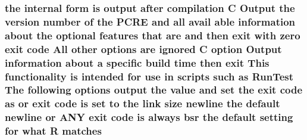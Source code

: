 \subsubsection[{\texorpdfstring{matches}{matches}}]{\setlength{\rightskip}{0pt plus 5cm}the internal form {\bf is} {\bf output} {\bf after} {\bf compilation} {\bf C} Output the version {\bf number} {\bf of} the {\bf P\+C\+RE} and {\bf all} avail {\bf able} information about the {\bf optional} {\bf features} that {\bf are} and then {\bf exit} {\bf with} {\bf zero} {\bf exit} {\bf code} All other {\bf options} {\bf are} {\bf ignored} {\bf C} {\bf option} Output information about {\bf a} specific build {\bf time} then {\bf exit} This functionality {\bf is} intended for use {\bf in} {\bf scripts} such {\bf as} Run\+Test The following {\bf options} {\bf output} the {\bf value} and {\bf set} the {\bf exit} {\bf code} {\bf as} {\bf or} {\bf exit} {\bf code} {\bf is} {\bf set} {\bf to} the link {\bf size} {\bf newline} the {\bf default} {\bf newline} {\bf or} A\+NY {\bf exit} {\bf code} {\bf is} always bsr the {\bf default} {\bf setting} for {\bf what} {\bf R} matches}\hypertarget{pcretest_8txt_ab8ea17b32f6f10b883a47b43406f4cd5}{}\label{pcretest_8txt_ab8ea17b32f6f10b883a47b43406f4cd5}
